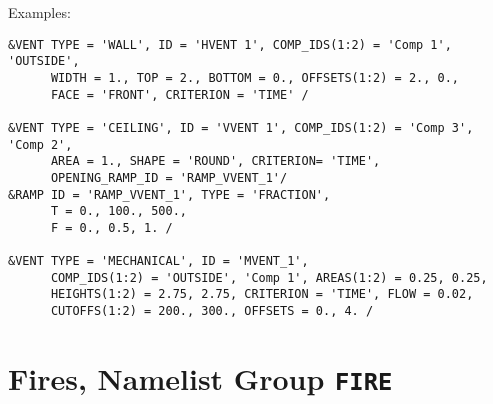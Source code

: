 \clearpage
\noindent Examples:
\begin{lstlisting}
&VENT TYPE = 'WALL', ID = 'HVENT 1', COMP_IDS(1:2) = 'Comp 1', 'OUTSIDE',
      WIDTH = 1., TOP = 2., BOTTOM = 0., OFFSETS(1:2) = 2., 0., 
      FACE = 'FRONT', CRITERION = 'TIME' /

&VENT TYPE = 'CEILING', ID = 'VVENT 1', COMP_IDS(1:2) = 'Comp 3', 'Comp 2',
      AREA = 1., SHAPE = 'ROUND', CRITERION= 'TIME', 
      OPENING_RAMP_ID = 'RAMP_VVENT_1'/
&RAMP ID = 'RAMP_VVENT_1', TYPE = 'FRACTION',
      T = 0., 100., 500.,
      F = 0., 0.5, 1. /

&VENT TYPE = 'MECHANICAL', ID = 'MVENT_1', 
      COMP_IDS(1:2) = 'OUTSIDE', 'Comp 1', AREAS(1:2) = 0.25, 0.25, 
      HEIGHTS(1:2) = 2.75, 2.75, CRITERION = 'TIME', FLOW = 0.02, 
      CUTOFFS(1:2) = 200., 300., OFFSETS = 0., 4. /

\end{lstlisting}




\clearpage
\section{Fires, Namelist Group \texorpdfstring{{\tt FIRE}}{FIRE}}
\label{info:FIRE3}

